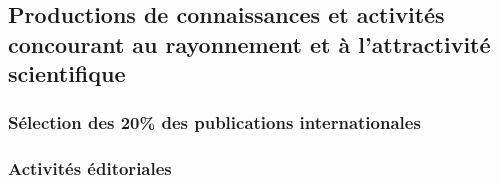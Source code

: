 
\subsection{Productions de connaissances et activités concourant au rayonnement et à l'attractivité scientifique}

\begin{refsection}
 
\nocite{castagliola:hal-02002980,alhasan:hal-01875359,schemeleva:hal-01734617,ivanov:hal-01770431,dolgui:hal-01709442,lepore:hal-01697729,dolgui:hal-01774847,bellenguezmorineau:hal-01836884,garzavenegas:hal-01824643,ivanov:hal-01961206,
maleki:hal-01905445,khaw:hal-01895172,saha:hal-01811791,yeong:hal-01716541,tran:hal-01731361,hu:hal-01835841,tang:hal-01806538,celano:hal-01921379,celano:hal-01921386,sabahno:hal-01921390}
 
 
 \subsubsection{Sélection des 20\% des publications internationales}
  \printbibliography[heading=none]

\end{refsection}
 
\subsubsection{Activités éditoriales}



